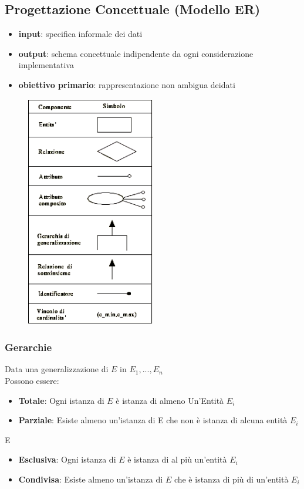 \subsection{Progettazione Concettuale (Modello ER)}

\begin{itemize}
    \item \textbf{input}: specifica informale dei dati
    \item \textbf{output}: schema concettuale indipendente da ogni considerazione implementativa
    \item \textbf{obiettivo primario}: rappresentazione non ambigua deidati
\end{itemize}

\begin{figure}[h]
    \centering
    \includegraphics[width=0.5\textwidth, height=4in, keepaspectratio]{images/ER1.png}
    \label{fig:er}
\end{figure}

\subsubsection{Gerarchie}
Data una generalizzazione di $E$ in $E_1, ..., E_n$\\
Possono essere:
\begin{itemize}
    \item \textbf{Totale}: Ogni istanza di $E$ \`e istanza di almeno Un'Entità $E_i$
    \item \textbf{Parziale}: Esiste almeno un'istanza di E che non \`e istanza di alcuna entità $E_i$
\end{itemize}
E
\begin{itemize}
    \item \textbf{Esclusiva}: Ogni istanza di $E$ \`e istanza di al più un'entità $E_i$
    \item \textbf{Condivisa}: Esiste almeno un'istanza di $E$ che \`e istanza di più di un'entità $E_i$
\end{itemize}

